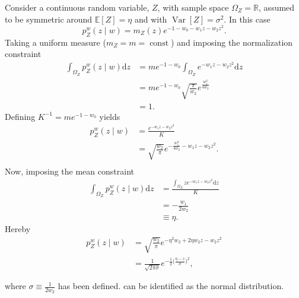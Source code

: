 \begin{example}
	Consider a continuous random variable, $Z$, with sample space $\Omega_Z=\mathbb{R}$, assumed to be symmetric around $\mathbb{E}[Z]=\eta$ and with $\operatorname{Var}[Z] = \sigma^2$. In this case
	\begin{equation}
			p_{Z}^w(z \mid w)= m_Z(z) e^{-1 - w_0 - w_1z-w_2z^2}.
	\end{equation}
	Taking a uniform measure ($m_Z= m=\operatorname{const}$) and imposing the normalization constraint
	\begin{equation}
		\begin{split}
			\int_{\Omega_Z} p_{Z}^w(z\mid w) \mathrm{d}z &= me^{-1-w_0}\int_{\Omega_Z} e^{-w_1z-w_2z^2} \mathrm{d}z\\
			&= me^{-1-w_0}\sqrt{\frac{\pi}{w_2}}e^{\frac{w_1^2}{4w_2}}\\
			&=1.
		\end{split}
	\end{equation}
	Defining $K^{-1} = me^{-1-w_0}$ yields
	\begin{equation}
		\begin{split}
			p_{Z}^w(z \mid w) &= \frac{e^{-w_1z-w_2z^2}}{K}\\
			&= \sqrt{\frac{w_2}{\pi}}e^{-\frac{w_1^2}{4w_2}-w_1z-w_2z^2}.\\
		\end{split}
	\end{equation}
	Now, imposing the mean constraint
	\begin{equation}
		\begin{split}
			\int_{\Omega_Z} p_{Z}^w(z\mid w) \mathrm{d}z &= \frac{\int_{\Omega_Z} ze^{-w_1z-w_2z^2}\mathrm{d}z}{K}\\
			&= -\frac{w_1}{2w_2}\\
			&\equiv\eta.
		\end{split}
	\end{equation}
	Hereby
	\begin{equation}
		\begin{split}
			p_{Z}^w(z\mid w) &= \sqrt{\frac{w_2}{\pi}}e^{-\eta^2w_2+2\eta w_2z-w_2z^2}\\
			&= \frac{1}{\sqrt{2\pi\sigma}}e^{-\frac{1}{2}\big(\frac{\eta-z}{\sigma}\big)^2},\\\\
		\end{split}
		\label{eq:norm1}
	\end{equation}
	where $\sigma\equiv \frac{1}{2w_2}$ has been defined.  can be identified as the normal distribution.
\end{example}

